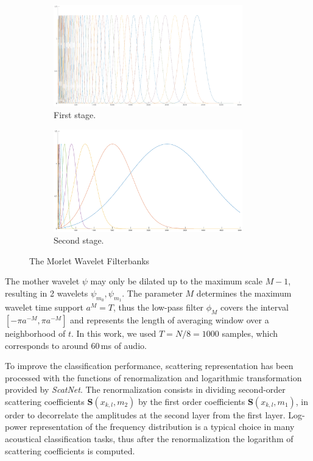 \begin{figure}[h]
	\centering
	\begin{subfigure}[b]{0.45\columnwidth}
		\includegraphics[width=0.9\textwidth]{img/scatter_filters_1.eps}
		\caption{First stage.}
	\end{subfigure}
	\begin{subfigure}[b]{0.45\columnwidth}
		\includegraphics[width=0.9\textwidth]{img/scatter_filters_2.eps}
		\caption{Second stage.}
	\end{subfigure}
	\caption{The Morlet Wavelet Filterbanks}\label{fig:filters}
\end{figure}

The mother wavelet $\psi$ may only be dilated up to the maximum scale $M-1$, resulting in 2 wavelets $\psi_{m_0}, \psi_{m_1}$. The parameter $M$ determines the maximum wavelet time support $a^M=T$,
thus the low-pass filter $\phi_M$ covers the interval $[-\pi a^{-M},\pi a^{-M}]$ and represents the length of averaging window over a neighborhood of $t$. 
In this work, we used $T=N/8=1000$ samples, which corresponds to around 60\,ms of audio. 

To improve the classification performance, scattering representation has been processed with the functions of renormalization and logarithmic transformation provided by \textit{ScatNet}. The renormalization consists in dividing second-order scattering coefficients $\mathbf{S}(x_{k,l}, m_2)$ by the first order coefficients $\mathbf{S}(x_{k,l}, m_1)$, in order to decorrelate the amplitudes at the second layer from the first layer. Log-power representation of the frequency distribution is a typical choice in many acoustical classification tasks, thus after the renormalization the logarithm of scattering coefficients is computed. 

